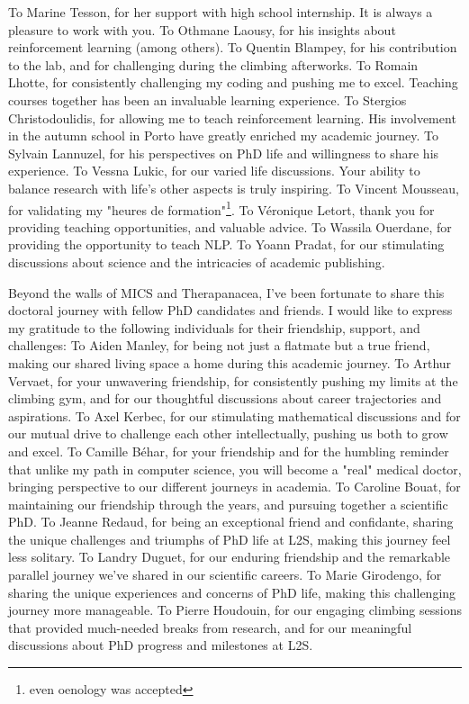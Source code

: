 To Marine Tesson, for her support with high school internship.
It is always a pleasure to work with you.\n
To Othmane Laousy, for his insights about reinforcement learning (among others).\n
To Quentin Blampey, for his contribution to the lab, and for challenging during the climbing afterworks.\n
To Romain Lhotte, for consistently challenging my coding and pushing me to excel.
Teaching courses together has been an invaluable learning experience.\n
To Stergios Christodoulidis, for allowing me to teach reinforcement learning.
His involvement in the autumn school in Porto have greatly enriched my academic journey.\n
To Sylvain Lannuzel, for his perspectives on PhD life and willingness to share his experience.\n
To Vessna Lukic, for our varied life discussions.
Your ability to balance research with life's other aspects is truly inspiring.\n
To Vincent Mousseau, for validating my "heures de formation"\footnote{even oenology was accepted}.\n
To Véronique Letort, thank you for providing teaching opportunities, and valuable advice.\n
To Wassila Ouerdane, for providing the opportunity to teach NLP.\n
To Yoann Pradat, for our stimulating discussions about science and the intricacies of academic publishing.\n


Beyond the walls of MICS and Therapanacea, I've been fortunate to share this doctoral journey with fellow PhD candidates and friends.
I would like to express my gratitude to the following individuals for their friendship, support, and challenges:\n
To Aiden Manley, for being not just a flatmate but a true friend, making our shared living space a home during this academic journey.\n
To Arthur Vervaet, for your unwavering friendship, for consistently pushing my limits at the climbing gym, and for our thoughtful discussions about career trajectories and aspirations.\n
To Axel Kerbec, for our stimulating mathematical discussions and for our mutual drive to challenge each other intellectually, pushing us both to grow and excel.\n
To Camille Béhar, for your friendship and for the humbling reminder that unlike my path in computer science, you will become a "real" medical doctor, bringing perspective to our different journeys in academia.\n
To Caroline Bouat, for maintaining our friendship through the years, and pursuing together a scientific PhD.\n
To Jeanne Redaud, for being an exceptional friend and confidante, sharing the unique challenges and triumphs of PhD life at L2S, making this journey feel less solitary.\n
To Landry Duguet, for our enduring friendship and the remarkable parallel journey we've shared in our scientific careers.\n
To Marie Girodengo, for sharing the unique experiences and concerns of PhD life, making this challenging journey more manageable.\n
To Pierre Houdouin, for our engaging climbing sessions that provided much-needed breaks from research, and for our meaningful discussions about PhD progress and milestones at L2S.\n


